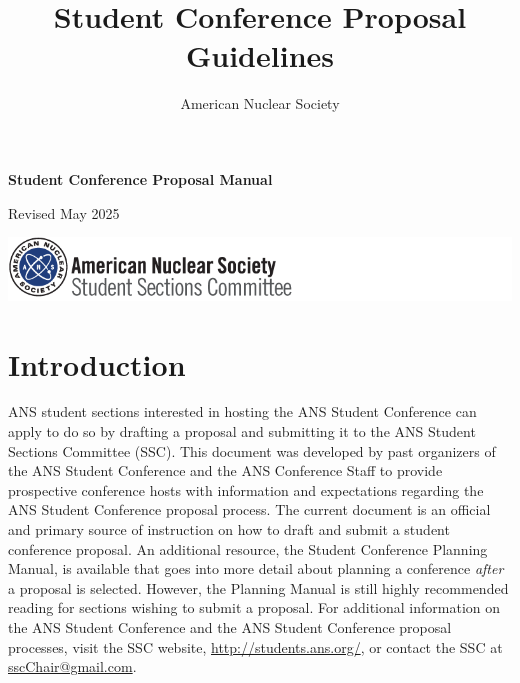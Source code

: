\documentclass[12pt]{article}
\title{\textbf{Student Conference Proposal Guidelines}}
\author{American Nuclear Society}
\date{}
\begin{document}
\newcommand{\redcolor}{\textcolor{red}}

\begin{titlepage}
\vspace*{2cm}
\centering
{\Huge\bfseries Student Conference Proposal Manual\par}

\vspace{2cm}
\rm{\Large Revised May 2025\par }

\vfill
\includegraphics[scale=0.75]{SSClogo.png}
\end{titlepage}


\clearpage
{\hypersetup{linkcolor=black}
\tableofcontents
}

\newpage

\section{Introduction}

ANS student sections interested in hosting the ANS Student Conference can apply to do so by drafting a proposal and submitting it to the ANS Student Sections Committee (SSC). This document was developed by past organizers of the ANS Student Conference and the ANS Conference Staff to provide prospective conference hosts with information and expectations regarding the ANS Student Conference proposal process. The current document is an official and primary source of instruction on how to draft and submit a student conference proposal. An additional resource, the Student Conference Planning Manual, is available that goes into more detail about planning a conference \emph{after} a proposal is selected. However, the Planning Manual is still highly recommended reading for sections wishing to submit a proposal. For additional information on the ANS Student Conference and the ANS Student Conference proposal processes, visit the SSC website, \href{http://students.ans.org/}{http://students.ans.org/}, or contact the SSC at \href{mailto:sscChair@gmail.com}{sscChair@gmail.com}.
\end{document}
